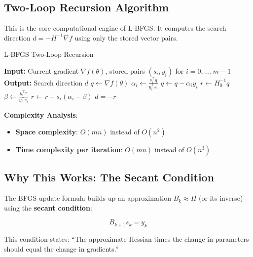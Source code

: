 \documentclass[11pt, a4paper, oneside]{article}
\begin{document}
\subsection{Two-Loop Recursion Algorithm}

This is the core computational engine of L-BFGS. It computes the search direction $d = -H^{-1} \nabla f$ using only the stored vector pairs.

\begin{algorithm}[H]
\caption{L-BFGS Two-Loop Recursion}
\label{alg:lbfgs}
\begin{algorithmic}[1]
\State \textbf{Input:} Current gradient $\nabla f(\theta)$, stored pairs $(s_i, y_i)$ for $i = 0, \ldots, m-1$
\State \textbf{Output:} Search direction $d$
\State
\State $q \gets \nabla f(\theta)$
\State
{}
    \State $\alpha_i \gets \frac{s_i^\top q}{y_i^\top s_i}$
    \State $q \gets q - \alpha_i y_i$
\EndFor
\State
\State $r \gets H_0^{-1} q$ 
\State
{}
    \State $\beta \gets \frac{y_i^\top r}{y_i^\top s_i}$
    \State $r \gets r + s_i (\alpha_i - \beta)$
\EndFor
\State
\State \Return $d = -r$ 
\end{algorithmic}
\end{algorithm}

\textbf{Complexity Analysis}:
\begin{itemize}
    \item \textbf{Space complexity}: $O(mn)$ instead of $O(n^2)$
    \item \textbf{Time complexity per iteration}: $O(mn)$ instead of $O(n^3)$
\end{itemize}

\subsection{Why This Works: The Secant Condition}

The BFGS update formula builds up an approximation $B_k \approx H$ (or its inverse) using the \textbf{secant condition}:

\begin{equation}
B_{k+1} s_k = y_k
\end{equation}

This condition states: ``The approximate Hessian times the change in parameters should equal the change in gradients.''
\end{document}
